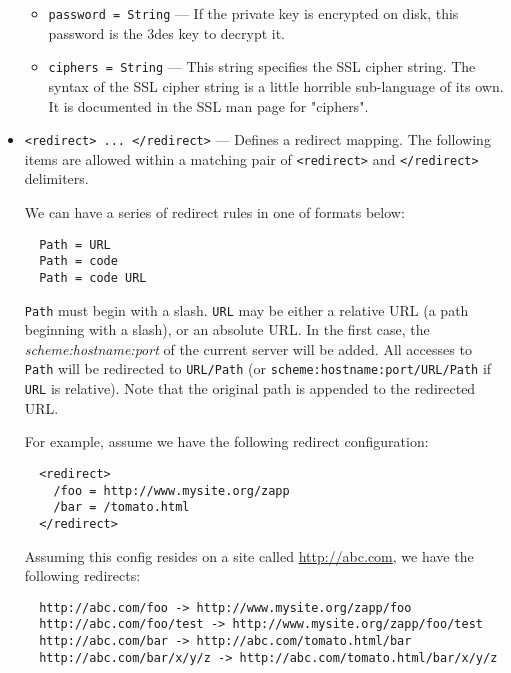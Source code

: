 \documentclass[11pt,oneside,english]{book}
\begin{document}
\begin{itemize}
\begin{itemize}
               \item \verb+password = String+ --- If the private key is
                 encrypted on disk, this password is the 3des key to decrypt it.

               \item \verb+ciphers = String+ --- This string specifies the SSL
                 cipher string.  The syntax of the SSL cipher string is a little
                 horrible sub-language of its own.  It is documented in the SSL
                 man page for "ciphers".
               \end{itemize}

\item       \verb+<redirect> ... </redirect>+ ---
              Defines a redirect mapping. The following items are allowed within
              a matching pair of \verb+<redirect>+ and \verb+</redirect>+
              delimiters.

              We can have a series of redirect rules in one of formats below:
\begin{verbatim}
  Path = URL
  Path = code
  Path = code URL
\end{verbatim}
              \verb+Path+ must begin with a slash. \verb+URL+ may be either a
              relative URL (a path beginning with a slash), or an absolute
              URL. In the first case, the \textit{scheme:hostname:port} of the
              current server will be added. All accesses to \verb+Path+ will be
              redirected to \verb+URL/Path+ (or
              \verb+scheme:hostname:port/URL/Path+ if \verb+URL+ is
              relative). Note that the original path is appended to the
              redirected URL.

              For example, assume we have the following redirect configuration:
\begin{verbatim}
  <redirect>
    /foo = http://www.mysite.org/zapp
    /bar = /tomato.html
  </redirect>
\end{verbatim}
              Assuming this config resides on a site called
              \url{http://abc.com}, we have the following redirects:
\begin{verbatim}
  http://abc.com/foo -> http://www.mysite.org/zapp/foo
  http://abc.com/foo/test -> http://www.mysite.org/zapp/foo/test
  http://abc.com/bar -> http://abc.com/tomato.html/bar
  http://abc.com/bar/x/y/z -> http://abc.com/tomato.html/bar/x/y/z
\end{verbatim}


\end{itemize}
\end{document}
